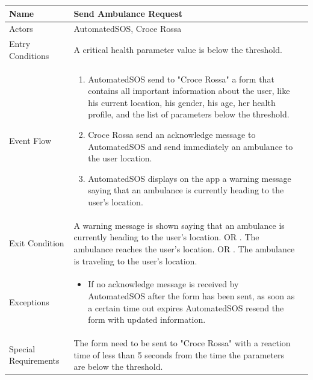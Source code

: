 \begin{enumerate}
\FloatBarrier
\begin{table}[h]
\begin{tabular}{|l|l p{3cm}|}
\hline
Name             & Send Ambulance Request \\ \hline
Actors           & AutomatedSOS, Croce Rossa  \\ \hline
Entry Conditions & A critical health parameter value is below the threshold. \\ \hline
Event Flow       & \parbox{\textwidth}{\begin{enumerate}
            \item AutomatedSOS send to "Croce Rossa" a form that contains all important information about the user, like his current location, his gender, his age, her health profile, and the list of parameters below the threshold.
            \item Croce Rossa send an acknowledge message to AutomatedSOS and send immediately an ambulance to the user location.
            \item AutomatedSOS displays on the app a warning message saying that an ambulance is currently heading to the user's location. 
        \end{enumerate}}\\ \hline
Exit Condition   & \parbox{\textwidth}{A warning message is shown saying that an ambulance is currently heading to the user's location. OR . The ambulance reaches the user's location. OR . The ambulance is traveling to the user's location.} \\ \hline
Exceptions       & \parbox{\textwidth}  
{\begin{itemize}
\item If no acknowledge message is received by AutomatedSOS after the form has been sent, as soon as a certain time out expires AutomatedSOS resend the form with updated information. \end{itemize}}\\ \hline
Special Requirements   & The form need to be sent to "Croce Rossa" with a reaction time of less than 5 seconds from the time the parameters are below the threshold. \\ \hline
\end{tabular}
\end{table}
\FloatBarrier


\end{enumerate}
